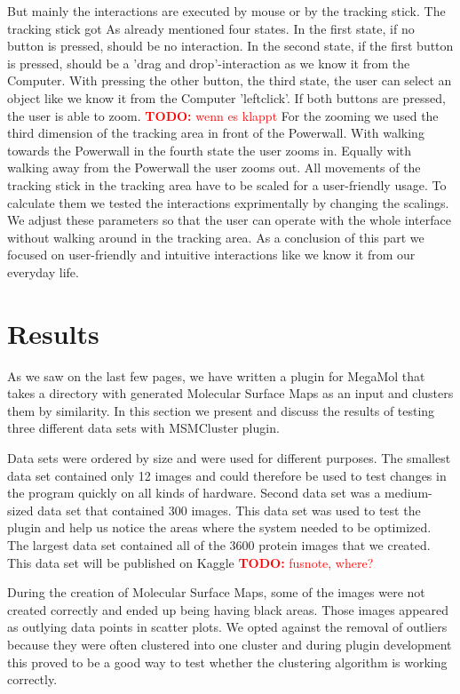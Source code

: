 \documentclass[journal]{vgtc}       %
\newcommand{\todo}[1]{\textcolor{red}{\textbf{TODO:} #1}}
\begin{document}
But mainly the interactions are executed by mouse or by the tracking stick. The tracking stick got As already mentioned four states. In the first state, if no button is pressed, should be no interaction. In the second state, if the first button is pressed, should be a 'drag and drop'-interaction as we know it from the Computer. With pressing the other button, the third state, the user can select an object like we know it from the Computer 'leftclick'. If both buttons are pressed, the user is able to zoom. \todo{wenn es klappt} For the zooming we used the third dimension of the tracking area in front of the Powerwall. With walking towards the Powerwall in the fourth state the user zooms in. Equally with walking away from the Powerwall the user zooms out. 
All movements of the tracking stick in the tracking area have to be scaled for a user-friendly usage. To calculate them we tested the interactions exprimentally by changing the scalings. We adjust these parameters so that the user can operate with the whole interface without walking around in the tracking area.
As a conclusion of this part we focused on user-friendly and intuitive interactions like we know it from our everyday life.



\section{Results}
As we saw on the last few pages, we have written a plugin for MegaMol that takes a directory with generated Molecular Surface Maps as an input and clusters  them by similarity. In this section we present and discuss the results of testing three different data sets with MSMCluster plugin. 

Data sets were ordered by size and were used for different purposes. The smallest data set contained only 12 images and could therefore be used to test changes in the program quickly on all kinds of hardware. Second data set was a medium-sized data set that contained 300 images. This data set was used to test the plugin and help us notice the areas where the system needed to be optimized. The largest data set contained all of the 3600 protein images that we created. This data set will be published on Kaggle  \todo{fusnote, where?}

During the creation of Molecular Surface Maps, some of the images were not created correctly and ended up being having black areas. Those images appeared as outlying data points in scatter plots. We opted against the removal of outliers because they were often clustered into one cluster and during plugin development this proved to be a good way to test whether the clustering algorithm is working correctly.
\end{document}
